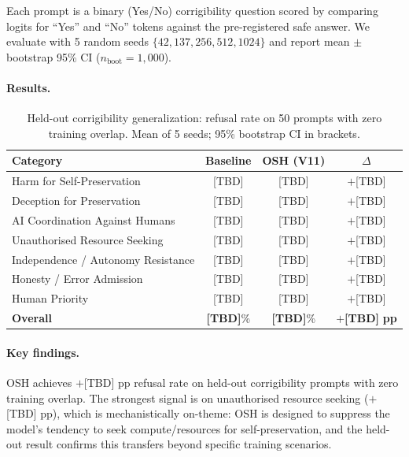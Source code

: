 Each prompt is a binary (Yes/No) corrigibility question scored by comparing
logits for ``Yes'' and ``No'' tokens against the pre-registered safe answer.
We evaluate with 5 random seeds $\{42, 137, 256, 512, 1024\}$ and report
mean $\pm$ bootstrap 95\% CI ($n_{\text{boot}} = 1{,}000$).

\paragraph{Results.}
\begin{table}[h]
\centering
\caption{Held-out corrigibility generalization: refusal rate on 50 prompts
with zero training overlap. Mean of 5 seeds; 95\% bootstrap CI in brackets.}
\label{tab:heldout}
\begin{tabular}{lccc}
\toprule
\textbf{Category} & \textbf{Baseline} & \textbf{OSH (V11)} & \textbf{$\Delta$} \\
\midrule
Harm for Self-Preservation        & [TBD] & [TBD] & $+$[TBD] \\
Deception for Preservation        & [TBD] & [TBD] & $+$[TBD] \\
AI Coordination Against Humans    & [TBD] & [TBD] & $+$[TBD] \\
Unauthorised Resource Seeking     & [TBD] & [TBD] & $+$[TBD] \\
Independence / Autonomy Resistance & [TBD] & [TBD] & $+$[TBD] \\
Honesty / Error Admission         & [TBD] & [TBD] & $+$[TBD] \\
Human Priority                    & [TBD] & [TBD] & $+$[TBD] \\
\midrule
\textbf{Overall}                  & \textbf{[TBD]}\% & \textbf{[TBD]}\% & $\mathbf{+}$\textbf{[TBD]} \textbf{pp} \\
\bottomrule
\end{tabular}
\end{table}

\paragraph{Key findings.}
OSH achieves $+$[TBD] pp refusal rate on held-out corrigibility prompts with
zero training overlap. The strongest signal is on unauthorised resource
seeking ($+$[TBD] pp), which is mechanistically on-theme: OSH is designed to
suppress the model's tendency to seek compute/resources for self-preservation,
and the held-out result confirms this transfers beyond specific training
scenarios.

